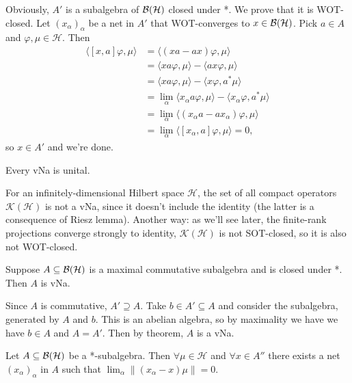\begin{myproof}
  Obviously, $A'$ is a subalgebra of $\operatorname{\mathcal{B} (\mathcal{H})}$ closed under *. We prove that it is WOT-closed.
  Let $(x_\alpha)_{\alpha}$ be a net in $A'$ that WOT-converges to $x \in \operatorname{\mathcal{B} (\mathcal{H})}$.
  Pick $a \in A$ and $\varphi, \mu \in \mathcal{H}$. Then 
  \begin{align*}
    \langle [x, a]\varphi, \mu\rangle &= \langle (xa - ax) \varphi, \mu\rangle\\ 
    &= \langle x a \varphi, \mu\rangle - \langle a x\varphi, \mu\rangle\\
    &= \langle x a \varphi, \mu\rangle - \langle x\varphi, a^*\mu\rangle\\
    &= \lim_{\alpha} \langle x_\alpha a \varphi, \mu\rangle - \langle x_\alpha \varphi, a^*\mu\rangle\\
    &= \lim_{\alpha} \langle (x_\alpha a - a x_\alpha) \varphi, \mu\rangle\\
    &= \lim_{\alpha} \langle [x_\alpha, a]\varphi, \mu\rangle = 0,
  \end{align*}
  so $x \in A'$ and we're done.
\end{myproof}

\begin{corollary}
  Every vNa is unital.
\end{corollary}

\begin{example}
  For an infinitely-dimensional Hilbert space $\mathcal{H}$, the set of all compact operators $\mathcal{K}(\mathcal{H})$
  is not a vNa, since it doesn't include the identity (the latter is a consequence of Riesz lemma).
  Another way: as we'll see later, the finite-rank projections converge strongly to identity, $\mathcal{K} (\mathcal{H})$
  is not SOT-closed, so it is also not WOT-closed.
\end{example}

\begin{corollary}
  Suppose $A \subseteq \operatorname{\mathcal{B} (\mathcal{H})}$ is a maximal commutative subalgebra and is closed under *.
  Then $A$ is vNa. 
\end{corollary}

\begin{myproof}
  Since $A$ is commutative, $A' \supseteq A$. Take $b \in A' \subseteq A$ and consider the subalgebra, generated by $A$ and $b$. This is an abelian algebra, so by maximality we have 
  we have $b \in A$ and $A = A'$. Then by theorem, $A$ is a vNa.
\end{myproof}

\begin{lemma}
  Let $A \subseteq \operatorname{\mathcal{B} (\mathcal{H})}$ be a *-subalgebra. Then $\forall \mu \in \mathcal{H}$ and $\forall x \in A''$
  there exists a net $(x_\alpha)_\alpha$ in $A$ such that $\lim_\alpha \| (x_\alpha - x)\mu \| = 0$.
\end{lemma}

